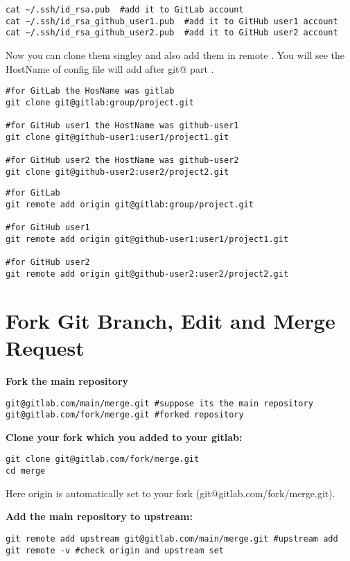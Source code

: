 \documentclass{article}
\begin{document}
\begin{lstlisting}
cat ~/.ssh/id_rsa.pub  #add it to GitLab account
cat ~/.ssh/id_rsa_github_user1.pub  #add it to GitHub user1 account 
cat ~/.ssh/id_rsa_github_user2.pub  #add it to GitHub user2 account 
\end{lstlisting}

Now you can clone them singley and also add them in remote . You will see the HostName of config file will add after git@ part . 

\begin{lstlisting}
#for GitLab the HosName was gitlab 
git clone git@gitlab:group/project.git

#for GitHub user1 the HostName was github-user1
git clone git@github-user1:user1/project1.git

#for GitHub user2 the HostName was github-user2
git clone git@github-user2:user2/project2.git	
\end{lstlisting}

\begin{lstlisting}
#for GitLab
git remote add origin git@gitlab:group/project.git

#for GitHub user1
git remote add origin git@github-user1:user1/project1.git

#for GitHub user2
git remote add origin git@github-user2:user2/project2.git	
\end{lstlisting}


\section{Fork Git Branch, Edit and Merge Request}

\textbf{Fork the main repository}
\begin{lstlisting}
git@gitlab.com/main/merge.git #suppose its the main repository
git@gitlab.com/fork/merge.git #forked repository	
\end{lstlisting}


\textbf{Clone your fork which you added to your gitlab:} 
\begin{lstlisting}
git clone git@gitlab.com/fork/merge.git 
cd merge	
\end{lstlisting}
Here origin is automatically set to your fork (git@gitlab.com/fork/merge.git). 


\textbf{Add the main repository to upstream:}
\begin{lstlisting}
git remote add upstream git@gitlab.com/main/merge.git #upstream add
git remote -v #check origin and upstream set 
\end{lstlisting}
\end{document}
